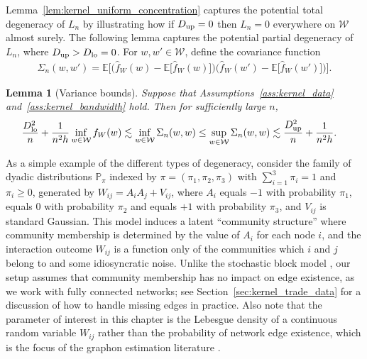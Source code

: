 \documentclass[11pt,lof]{puthesis}
\renewcommand{\P}{\ensuremath{\mathbb{P}}}
\newcommand{\E}{\ensuremath{\mathbb{E}}}
\newcommand{\cW}{\ensuremath{\mathcal{W}}}
\newcommand{\Dl}{\ensuremath{D_{\textup{lo}}}}
\newcommand{\Du}{\ensuremath{D_{\textup{up}}}}
\theoremstyle{break}
\newtheorem{lemma}{Lemma}[section]
\theoremstyle{proof}
\begin{document}
Lemma~\ref{lem:kernel_uniform_concentration} captures the potential total
degeneracy
of $L_n$ by illustrating how if $\Du=0$ then $L_n=0$ everywhere on $\cW$ almost
surely. The following lemma captures the potential partial degeneracy of $L_n$,
where $\Du > \Dl = 0$. For $w,w' \in \cW$, define the covariance function
%
\begin{align*}
  \Sigma_n(w,w') =
  \E\Big[
    \Big(
      \hat f_W(w)
      - \E\big[\hat f_W(w)\big]
    \Big)
    \Big(
      \hat f_W(w')
      - \E\big[\hat f_W(w')\big]
    \Big)
  \Big].
\end{align*}
%
\begin{lemma}[Variance bounds]
  \label{lem:kernel_variance_bounds}
  Suppose that Assumptions~\ref{ass:kernel_data} and~\ref{ass:kernel_bandwidth}
  hold. Then for sufficiently large $n$,
  \begin{align*}
    \frac{\Dl^2}{n} + \frac{1}{n^2h}
    \inf_{w \in \cW} f_W(w)
    &\lesssim
    \inf_{w \in \cW} \Sigma_n(w,w)
    \leq
    \sup_{w \in \cW} \Sigma_n(w,w)
    \lesssim
    \frac{\Du^2}{n} + \frac{1}{n^2h}.
  \end{align*}
\end{lemma}

As a simple example of the different types of degeneracy, consider the family
of dyadic distributions $\P_{\pi}$ indexed by $\pi = (\pi_1, \pi_2, \pi_3)$
with $\sum_{i=1}^3 \pi_i = 1$ and $\pi_i \geq 0$, generated by
$W_{i j} = A_i A_j + V_{i j}$, where $A_i$ equals $-1$ with probability
$\pi_1$, equals $0$ with probability $\pi_2$ and equals $+1$ with probability
$\pi_3$, and $V_{i j}$ is standard Gaussian. This model induces a latent
``community structure'' where community membership is determined by the value
of $A_i$ for each node $i$, and the interaction outcome $W_{i j}$ is a function
only of the communities which $i$ and $j$ belong to and some idiosyncratic
noise. Unlike the stochastic block model \citep{kolaczyk2009statistical}, our
setup assumes that community membership has no impact on edge existence, as we
work with fully connected networks; see Section~\ref{sec:kernel_trade_data} for
a
discussion of how to handle missing edges in practice. Also note that the
parameter of interest in this chapter is the Lebesgue density of a continuous
random variable $W_{i j}$ rather than the probability of network edge
existence, which is the focus of the graphon estimation literature
\citep{gao2021minimax}.
\end{document}
